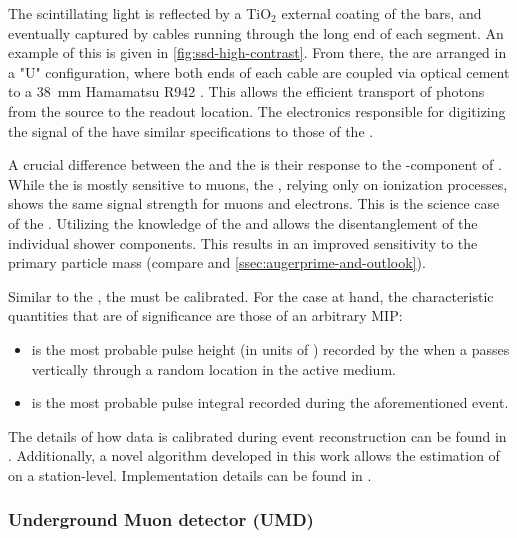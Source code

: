 The scintillating light is reflected by a TiO$_2$ external coating of the bars,
and eventually captured by \WLS cables running through the long end of each 
segment. An example of this is given in \cref{fig:ssd-high-contrast}. From 
there, the \WLSs are arranged in a "U" configuration, where both ends of each 
cable are coupled via optical cement to a \SI{38}{\milli\meter} Hamamatsu R942 
\PMT \cite{hamamatsuphotonicsPhotomultiplierTubeR9420}. This allows the 
efficient transport of photons from the source to the readout location. The
electronics responsible for digitizing the signal of the \SSD \PMT have similar 
specifications to those of the \WCD 
\cite{collaborationPierreAugerObservatory2016}.

A crucial difference between the \WCD and the \SSD is their response to the 
\EM-component of \EASs. While the \WCD is mostly sensitive to muons, the \SSD,
relying only on ionization processes, shows the same signal strength for muons
and electrons. This is the science case of the \SSD. Utilizing the knowledge of
the \WCD and \SSD allows the disentanglement of the individual shower 
components. This results in an improved sensitivity to the primary particle
mass (compare  and \cref{ssec:augerprime-and-outlook}).

Similar to the \WCD, the \SSD must be calibrated. For the case at hand, the 
characteristic quantities that are of significance are those of an arbitrary 
\acf{MIP}:

\begin{itemize}
	\item \Imip is the most probable pulse height (in units of \ADC) 
	recorded by the \SSD \PMT when a \MIP passes vertically through a 
	random location in the \SSD active medium.
	\item \Qmip is the most probable pulse integral recorded during the 
	aforementioned event.
\end{itemize}

The details of how \SSD data is calibrated during event reconstruction can be
found in . Additionally, a novel algorithm developed in this work
allows the estimation of \Imip on a station-level. Implementation details can be
found in .

\subsubsection{Underground Muon detector (UMD)}
\label{sssec:umd}

